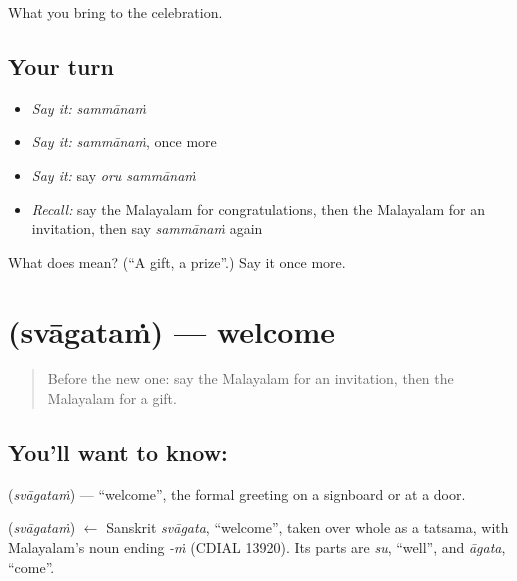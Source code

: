 \begin{grammarlens}[title={What you've built}]
What you bring to the celebration.
\end{grammarlens}

\subsection*{Your turn}
\begin{itemize}
\raggedright
  \item \emph{Say it:} \emph{sammānaṁ}
  \item \emph{Say it:} \emph{sammānaṁ}, once more
  \item \emph{Say it:} say \emph{oru sammānaṁ}
  \item \emph{Recall:} say the Malayalam for congratulations, then the Malayalam for an invitation, then say \emph{sammānaṁ} again
\end{itemize}

\begin{tcolorbox}[breakable,colback=teal!4,colframe=teal!35!black,title={Before you move on}]
What does  mean? (\textquotedblleft{}A gift, a prize\textquotedblright{}.) Say it once more.
\end{tcolorbox}
\section[\texorpdfstring{\ml{സ്വാഗതം} (svāgataṁ)}{സ്വാഗതം (svāgataṁ)}]{ (svāgataṁ) — welcome}

\label{lesson:ML-C124-welcome}



\begin{quote}
Before the new one: say the Malayalam for an invitation, then the Malayalam for a gift.
\end{quote}

\subsection*{You'll want to know: }
\textbf{} (\emph{svāgataṁ}) — \textquotedblleft{}welcome\textquotedblright{}, the formal greeting on a signboard or at a door.

\begin{cousinweb}
\textbf{} (\emph{svāgataṁ}) $\leftarrow$ Sanskrit \emph{svāgata}, \textquotedblleft{}welcome\textquotedblright{}, taken over whole as a tatsama, with Malayalam's noun ending \emph{-ṁ} (CDIAL 13920). Its parts are \emph{su}, \textquotedblleft{}well\textquotedblright{}, and \emph{āgata}, \textquotedblleft{}come\textquotedblright{}.
\end{cousinweb}


